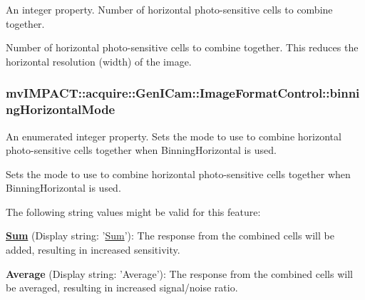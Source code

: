 An integer property. Number of horizontal photo-\/sensitive cells to combine together. 

Number of horizontal photo-\/sensitive cells to combine together. This reduces the horizontal resolution (width) of the image. \hypertarget{classmv_i_m_p_a_c_t_1_1acquire_1_1_gen_i_cam_1_1_image_format_control_aa5c3bf007ccc16a550ae487cddb9343e}{
\subsubsection[{binning\+Horizontal\+Mode}]{ mv\+I\+M\+P\+A\+C\+T\+::acquire\+::\+Gen\+I\+Cam\+::\+Image\+Format\+Control\+::binning\+Horizontal\+Mode}}\label{classmv_i_m_p_a_c_t_1_1acquire_1_1_gen_i_cam_1_1_image_format_control_aa5c3bf007ccc16a550ae487cddb9343e}


An enumerated integer property. Sets the mode to use to combine horizontal photo-\/sensitive cells together when Binning\+Horizontal is used. 

Sets the mode to use to combine horizontal photo-\/sensitive cells together when Binning\+Horizontal is used.

The following string values might be valid for this feature\+:
\begin{DoxyItemize}
\item {\bfseries \hyperlink{class_sum}{Sum}} (Display string\+: '\hyperlink{class_sum}{Sum}')\+: The response from the combined cells will be added, resulting in increased sensitivity.
\item {\bfseries Average} (Display string\+: 'Average')\+: The response from the combined cells will be averaged, resulting in increased signal/noise ratio.
\end{DoxyItemize}

